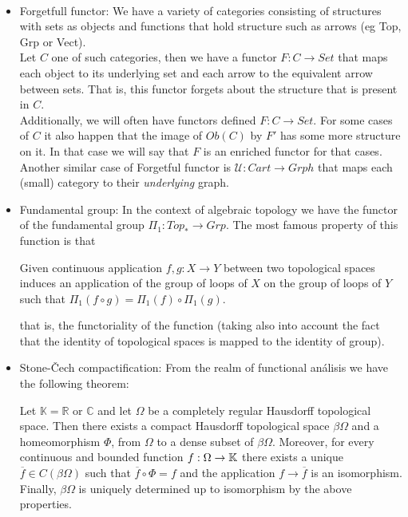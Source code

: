 \begin{example}\ 
  \begin{itemize}
  \item {Forgetfull functor}: We have a variety of categories consisting of structures with sets as objects and functions that hold structure such as arrows (eg Top, Grp or Vect).\\
    
    Let $C$ one of such  categories, then we have a functor $F:C\to Set$ that maps each object to its underlying set and each arrow to the equivalent arrow between sets. That is, this functor forgets about the structure that is present in $C$.\\

    Additionally, we will often have functors defined $F:C\to Set$. For some cases of $C$ it also happen that the image of $Ob(C)$ by $F'$ has some more structure on it. In that case we will say that $F$ is an enriched functor for that cases.\\

    Another similar case of Forgetful functor is $\mathcal{U}:Cart \to Grph$ that maps each (small) category to their \emph{underlying} graph. 
  \item Fundamental group: In the context of algebraic topology we have the functor of the fundamental group $\Pi_1: Top_* \to Grp$. The most famous property of this function is that

    
    \begin{displayquote}
      Given continuous application $ f,g:X \to Y$ between two topological spaces induces an application of the group of loops of $X$ on the group of loops of $Y$ such that $\Pi_1(f \circ g) = \Pi_1(f) \circ \Pi_1(g)$.
    \end{displayquote}

    that is, the functoriality of the function (taking also into account the fact that the identity of topological spaces is mapped to the identity of group). 

  \item Stone-\v{C}ech compactification:  From the realm of functional análisis we have the following theorem:

    \begin{theorem} Let $\mathbb{K}=\mathbb R $ or $\mathbb C$ and let $\Omega$ be a completely regular Hausdorff topological space. Then there exists a compact Hausdorff topological space $\beta \Omega$ and a homeomorphism $\Phi$, from $\Omega$ to a dense subset of $\beta\Omega$. Moreover, for every continuous and bounded function $f: \Omega \to \mathbb{K}$ there exists a unique $\overline{f} \in C(\beta \Omega)$ such that $\overline{f}\circ \Phi = f$ and the application $f \to \overline{f}$ is an isomorphism. Finally, $\beta \Omega$ is uniquely determined up to isomorphism by the above properties.
    \end{theorem}


\end{itemize}
\end{example}
